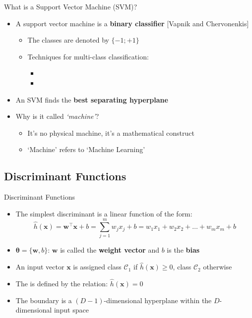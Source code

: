 \begin{frame}{What is a Support Vector Machine (SVM)?}{}
	\begin{itemize}
		\item A support vector machine is a \textbf{binary classifier}
			{\footnotesize [Vapnik and Chervonenkis]}
		\begin{itemize}
			\item The classes are denoted by $\{-1; +1\}$
			\item Techniques for multi-class classification:
			\begin{itemize}
				\item {}
				\item {}
			\end{itemize}
		\end{itemize}
		\item An SVM finds the \textbf{best separating hyperplane}
		\item Why is it called \textit{`machine'}?
		\begin{itemize}
			\item It's no physical machine, it's a mathematical construct \\
			\item `Machine' refers to `Machine Learning' 
		\end{itemize}
	\end{itemize}
\end{frame}


\subsection{Discriminant Functions}

\begin{frame}{Discriminant Functions}{}
	\begin{itemize}
		\item The simplest discriminant is a linear function of the form:
		\begin{equation}
			\widehat{h}(\bm{x})
				= \bm{w}^{\intercal} \bm{x} + b
				= \sum_{j=1}^m w_j x_j + b
				= w_1 x_1 + w_2 x_2 + \dots + w_m x_m + b
		\end{equation} 
		\item $\bm{\theta} = \{ \bm{w}, b \}$: $\bm{w}$ is called the \textbf{weight vector} and $b$ is the \textbf{bias}
		\item An input vector $\bm{x}$ is assigned class $\mathcal{C}_1$ if $\widehat{h}(\bm{x}) \ge 0$,
			class $\mathcal{C}_2$ otherwise
		\item The  is defined by the relation: $\widehat{h}(\bm{x}) = 0$
		\item The boundary is a $(D - 1)$-dimensional hyperplane within the $D$-dimensional input space
	\end{itemize}
\end{frame}



